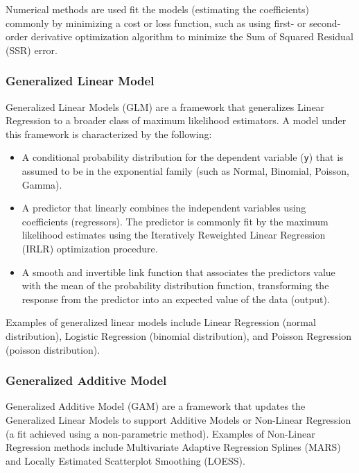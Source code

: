 \begin{bibunit}
Numerical methods are used fit the models (estimating the coefficients) commonly by minimizing a cost or loss function, such as using first- or second-order derivative optimization algorithm to minimize the Sum of Squared Residual (SSR) error.

\subsubsection{Generalized Linear Model}
Generalized Linear Models (GLM) are a framework that generalizes Linear Regression to a broader class of maximum likelihood estimators. A model under this framework is characterized by the following:

\begin{itemize}
	\item A conditional probability distribution for the dependent variable (\texttt{y}) that is assumed to be in the exponential family (such as Normal, Binomial, Poisson, Gamma).
	\item A predictor that linearly combines the independent variables using coefficients (regressors). The predictor is commonly fit by the maximum likelihood estimates using the Iteratively Reweighted Linear Regression (IRLR) optimization procedure.
	\item A smooth and invertible link function that associates the predictors value with the mean of the probability distribution function, transforming the response from the predictor into an expected value of the data (output).
\end{itemize}

Examples of generalized linear models include Linear Regression (normal distribution), Logistic Regression (binomial distribution), and Poisson Regression (poisson distribution). 

\subsubsection{Generalized Additive Model}
Generalized Additive Model (GAM) are a framework that updates the Generalized Linear Models to support Additive Models or Non-Linear Regression (a fit achieved using a non-parametric method).
Examples of Non-Linear Regression methods include Multivariate Adaptive Regression Splines (MARS) and Locally Estimated Scatterplot Smoothing (LOESS).



\end{bibunit}
